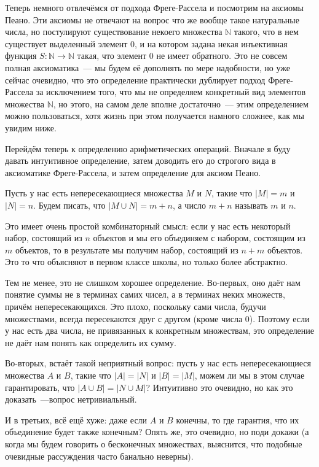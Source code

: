 Теперь немного отвлечёмся от подхода Фреге-Рассела и посмотрим на аксиомы Пеано. Эти аксиомы не отвечают на вопрос что же вообще такое натуральные числа, но постулируют существование некоего множества $\mathbb{N}$ такого, что в нем существует выделенный элемент 0, и на котором задана некая инъективная функция $S:\mathbb{N}\to\mathbb{N}$ такая, что элемент 0 не имеет обратного. Это не совсем полная аксиоматика~— мы будем её дополнять по мере надобности, но уже сейчас очевидно, что это определение практически дублирует подход Фреге-Рассела за исключением того, что мы не определяем конкретный вид элементов множества $\mathbb{N}$, но этого, на самом деле вполне достаточно~— этим определением можно пользоваться, хотя жизнь при этом получается намного сложнее, как мы увидим ниже.

Перейдём теперь к определению арифметических операций. Вначале я буду давать интуитивное определение, затем доводить его до строгого вида в аксиоматике Фреге-Рассела, и затем определение для аксиом Пеано.

\begin{definition}
Пусть у нас есть непересекающиеся множества $M$ и $N$, такие что $|M|=m$ и $|N| = n$. Будем писать, что $|M\cup N| = m+n$, а число $m+n$ называть  $m$ и $n$.
\end{definition}

Это имеет очень простой комбинаторный смысл: если у нас есть некоторый набор, состоящий из $n$ объектов и мы его объединяем с набором, состоящим из $m$ объектов, то в результате мы получим набор, состоящий из $n+m$ объектов. Это то что объясняют в первом классе школы, но только более абстрактно.

Тем не менее, это не слишком хорошее определение. Во-первых, оно даёт нам понятие суммы не в терминах самих чисел, а в терминах неких множеств, причём непересекающихся. Это плохо, поскольку сами числа, будучи множествами, всегда пересекаются друг с другом (кроме числа 0). Поэтому если у нас есть два числа, не привязанных к конкретным множествам, это определение не даёт нам понять как определить их сумму.

Во-вторых, встаёт такой неприятный вопрос: пусть у нас есть непересекающиеся множества $A$ и $B$, такие что $|A|=|N|$ и $|B|=|M|$, можем ли мы в этом случае гарантировать, что $|A\cup B| = |N\cup M|$? Интуитивно это очевидно, но как это доказать~---вопрос нетривиальный.

И в третьих, всё ещё хуже: даже если $A$ и $B$ конечны, то где гарантия, что их объединение будет также конечным? Опять же, это очевидно, но поди докажи (а когда мы будем говорить о бесконечных множествах, выяснится, что подобные очевидные рассуждения часто банально неверны).

